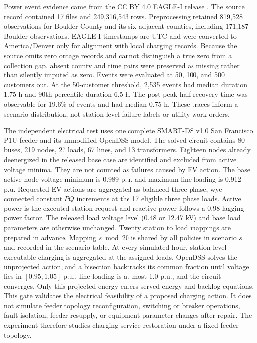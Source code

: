 \documentclass[journal]{IEEEtran}
\begin{document}
Power event evidence came from the CC BY 4.0 EAGLE-I release
\cite{brelsford2024eaglei}.  The source record contained 17 files and
249,316,543 rows.  Preprocessing retained
819,528 observations for Boulder County and its six adjacent counties,
including 171,187 Boulder observations.  EAGLE-I timestamps are UTC and were
converted to America/Denver only for alignment with local charging records.
Because the source omits zero outage records and cannot distinguish a true zero
from a collection gap, absent county and time pairs were preserved as missing
rather than silently imputed as zero.  Events were evaluated at 50, 100, and
500 customers out.  At the 50-customer threshold, 2,535 events had median
duration 1.75 h and 90th percentile duration 6.5 h.  The post peak half recovery
time was observable for 19.6\% of events and had median 0.75 h.  These traces
inform a scenario distribution, not station level failure labels or utility
work orders.

The independent electrical test uses one complete SMART-DS v1.0 San Francisco
P1U feeder and its unmodified OpenDSS model.  The solved circuit contains 80
buses, 219 nodes, 27 loads,
67 lines, and 13 transformers.  Eighteen nodes already deenergized in the
released base case are identified and excluded from active voltage minima.
They are not counted as failures caused by EV action.  The base active node voltage
minimum is 0.989 p.u. and maximum line loading is 0.912 p.u.  Requested EV
actions are aggregated as balanced three phase, wye connected constant $PQ$
increments at the 17 eligible three phase loads.  Active power is the executed
station request and reactive power follows a 0.98 lagging power factor.  The
released load voltage level (0.48 or 12.47 kV) and base load parameters are
otherwise unchanged.  Twenty
station to load mappings are prepared in advance.  Mapping $s\bmod20$ is
shared by all policies in scenario $s$ and recorded in the scenario table.
At every simulated hour, station level executable charging is aggregated at the
assigned loads, OpenDSS solves the unprojected action, and a bisection backtracks
its common fraction until voltage lies in $[0.95,1.05]$ p.u., line loading is at
most 1.0 p.u., and the circuit converges.  Only this projected energy enters
served energy and backlog equations.  This gate validates the electrical
feasibility of a proposed charging action.  It does not simulate feeder
topology reconfiguration, switching or breaker operations, fault isolation,
feeder resupply, or equipment parameter changes after repair.  The experiment
therefore studies charging service restoration under a fixed feeder topology.
\end{document}
